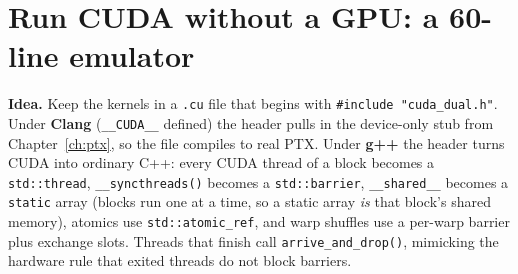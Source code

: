 \documentclass[10pt,a4paper,openany,oneside]{report}
\newcommand{\prio}[1]{\texorpdfstring{\ifcase#1\or{\color{gold}\ding{72}}\or{\color{gold}\ding{72}\ding{72}}\or{\color{gold}\ding{72}\ding{72}\ding{72}}\fi}{}}
\begin{document}
\section{Run CUDA without a GPU: a 60-line emulator \prio{2}}
\label{sec:emu}
\textbf{Idea.} Keep the kernels in a \texttt{.cu} file that begins with \texttt{\#include "cuda\_dual.h"}. Under \textbf{Clang} (\texttt{\_\_CUDA\_\_} defined) the header pulls in the device-only stub from Chapter~\ref{ch:ptx}, so the file compiles to real PTX. Under \textbf{g++} the header turns CUDA into ordinary C++: every CUDA thread of a block becomes a \texttt{std::thread}, \texttt{\_\_syncthreads()} becomes a \texttt{std::barrier}, \texttt{\_\_shared\_\_} becomes a \texttt{static} array (blocks run one at a time, so a static array \emph{is} that block's shared memory), atomics use \texttt{std::atomic\_ref}, and warp shuffles use a per-warp barrier plus exchange slots. Threads that finish call \texttt{arrive\_and\_drop()}, mimicking the hardware rule that exited threads do not block barriers.
\end{document}
